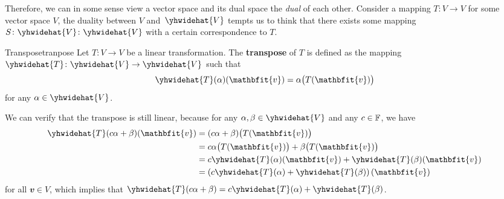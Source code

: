 \documentclass[math, code]{amznotes}
\theoremstyle{remark}
\begin{document}
Therefore, we can in some sense view a vector space and its dual space the \textit{dual} of each other. Consider a mapping $T \colon V \to V$ for some vector space $V$, the duality between $V$ and~$\yhwidehat{V}$ tempts us to think that there exists some mapping $S \colon \yhwidehat{V} \colon \yhwidehat{V}$ with a certain correspondence to $T$.
\begin{dfnbox}{Transpose}{tranpose}
    Let $T \colon V \to V$ be a linear transformation. The {\color{red} \textbf{transpose}} of $T$ is defined as the mapping~$\yhwidehat{T} \colon \yhwidehat{V} \to \yhwidehat{V}$ such that 
    \begin{equation*}
        \yhwidehat{T}(\alpha)(\mathbfit{v}) = \alpha\bigl(T(\mathbfit{v})\bigr)
    \end{equation*}
    for any $\alpha \in \yhwidehat{V}$. 
\end{dfnbox}
We can verify that the transpose is still linear, because for any $\alpha, \beta \in \yhwidehat{V}$ and any $c \in \mathbb{F}$, we have 
\begin{align*}
    \yhwidehat{T}(c\alpha + \beta)(\mathbfit{v}) & = (c\alpha + \beta)\bigl(T(\mathbfit{v})\bigr) \\
    & = c\alpha\bigl(T(\mathbfit{v})\bigr) + \beta\bigl(T(\mathbfit{v})\bigr) \\
    & = c\yhwidehat{T}(\alpha)(\mathbfit{v}) + \yhwidehat{T}(\beta)(\mathbfit{v}) \\
    & = \left(c\yhwidehat{T}(\alpha) + \yhwidehat{T}(\beta)\right)(\mathbfit{v})
\end{align*}
for all $\mathbfit{v} \in V$, which implies that $\yhwidehat{T}(c\alpha + \beta) = c\yhwidehat{T}(\alpha) + \yhwidehat{T}(\beta)$.
\end{document}

